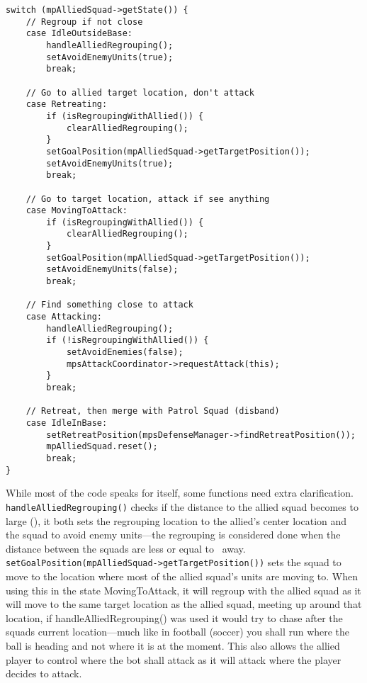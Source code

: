 \begin{lstlisting}[caption={Squad actions depending on the allied squad's state.},label={lst:attack_follow_allied}]
switch (mpAlliedSquad->getState()) {
	// Regroup if not close
	case IdleOutsideBase:
		handleAlliedRegrouping();
		setAvoidEnemyUnits(true);
		break;
	
	// Go to allied target location, don't attack
	case Retreating:
		if (isRegroupingWithAllied()) {
			clearAlliedRegrouping();
		}
		setGoalPosition(mpAlliedSquad->getTargetPosition());
		setAvoidEnemyUnits(true);
		break;

	// Go to target location, attack if see anything
	case MovingToAttack: 
		if (isRegroupingWithAllied()) {
			clearAlliedRegrouping();
		}
		setGoalPosition(mpAlliedSquad->getTargetPosition());
		setAvoidEnemyUnits(false);
		break;

	// Find something close to attack
	case Attacking:
		handleAlliedRegrouping();
		if (!isRegroupingWithAllied()) {
			setAvoidEnemies(false);
			mpsAttackCoordinator->requestAttack(this);
		}
		break;

	// Retreat, then merge with Patrol Squad (disband)
	case IdleInBase:
		setRetreatPosition(mpsDefenseManager->findRetreatPosition());
		mpAlliedSquad.reset();
		break;
}
\end{lstlisting}
While most of the code speaks for itself, some functions need extra clarification. \texttt{handleAlliedRegrouping()} checks if the distance to the allied squad becomes to large (\squadAttackAlliedRegroupBegin), it both sets the regrouping location to the allied's center location and the squad to avoid enemy units—the regrouping is considered done when the distance between the squads are less or equal to \squadAttackAlliedRegroupEnd~away. \texttt{setGoalPosition(mpAlliedSquad->getTargetPosition())} sets the squad to move to the location where most of the allied squad's units are moving to. When using this in the state MovingToAttack, it will regroup with the allied squad as it will move to the same target location as the allied squad, meeting up around that location, if handleAlliedRegrouping() was used it would try to chase after the squads current location—much like in football (soccer) you shall run where the ball is heading and not where it is at the moment. This also allows the allied player to control where the bot shall attack as it will attack where the player decides to attack.

